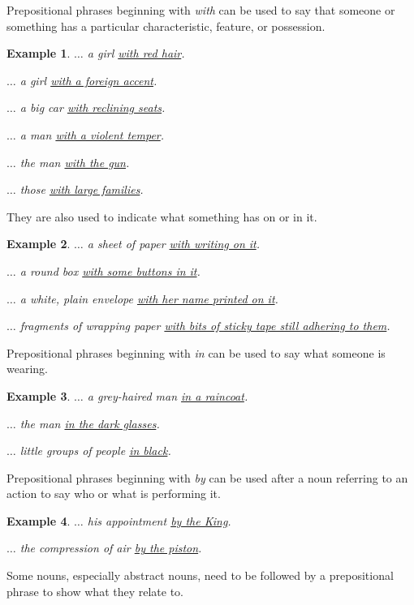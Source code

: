 \documentclass[oneside]{book}
\numberwithin{equation}{section}
\newtheorem{example}{Example}[section]
\begin{document}
%
\noindent{} Prepositional phrases beginning with \textit{with} can be used to say that someone or something has a particular characteristic, feature, or possession.
\begin{example}
    $\ldots$ a girl \underline{with red hair}.
    
    $\ldots$ a girl \underline{with a foreign accent}.
    
    $\ldots$ a big car \underline{with reclining seats}.
    
    $\ldots$ a man \underline{with a violent temper}.
    
    $\ldots$ the man \underline{with the gun}.
    
    $\ldots$ those \underline{with large families}.
\end{example}
They are also used to indicate what something has on or in it.
\begin{example}
    $\ldots$ a sheet of paper \underline{with writing on it}.
    
    $\ldots$ a round box \underline{with some buttons in it}.
    
    $\ldots$ a white, plain envelope \underline{with her name printed on it}.
    
    $\ldots$ fragments of wrapping paper \underline{with bits of sticky tape still adhering to them}.
\end{example}
%
\noindent{} Prepositional phrases beginning with \textit{in} can be used to say what someone is wearing.
\begin{example}
    $\ldots$ a grey-haired man \underline{in a raincoat}.
    
    $\ldots$ the man \underline{in the dark glasses}.
    
    $\ldots$ little groups of people \underline{in black}.
\end{example}
%
\noindent{} Prepositional phrases beginning with \textit{by} can be used after a noun referring to an action to say who or what is performing it.
\begin{example}
    $\ldots$ his appointment \underline{by the King}.
    
    $\ldots$ the compression of air \underline{by the piston}.
\end{example}
%
\noindent{} Some nouns, especially abstract nouns, need to be followed by a prepositional phrase to show what they relate to.
\end{document}
